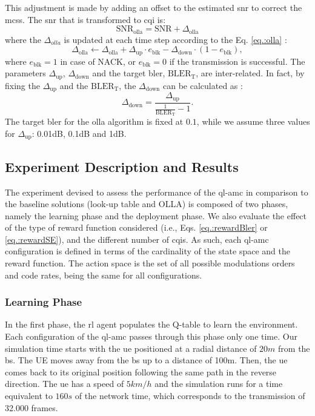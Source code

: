 %
This adjustment is made by adding an offset to the estimated \gls{snr} to correct the \gls{mcs}s.
%
The \gls{snr} that is transformed to \gls{cqi} is:
\begin{equation}
\textrm{SNR}_{\text{olla}} = \textrm{SNR} + \Delta_{\text{olla}}
\end{equation}
\noindent where the $\Delta_{olla}$ is updated at each time step according to the Eq. \eqref{eq.:olla} \cite{Blanquez-Casado2016}:
\begin{equation}\label{eq.:olla}
  \Delta_{\text{olla}} \leftarrow \Delta_{\text{olla}} + \Delta_{\text{up}} \cdot e_{\text{blk}} - \Delta_{\text{down}} \cdot (1 - e_{\text{blk}}),
\end{equation}
\noindent where $e_{\text{blk}} = 1$ in case of NACK, or $e_{\text{blk}} = 0$ if the transmission is successful.
%
The parameters $\Delta_{\text{up}}$, $\Delta_{\text{down}}$ and the target \gls{bler}, $\textrm{BLER}_{\text{T}}$, are inter-related. In fact, by fixing the $\Delta_{\text{up}}$ and the $\textrm{BLER}_{\text{T}}$, the $\Delta_{\text{down}}$ can be calculated as \cite{Pedersen2007}:
$$
\Delta_{\text{down}} = \frac{\Delta_{\text{up}}}{\frac{1}{\textrm{BLER}_{\text{T}}} -1}.
$$
The target \gls{bler} for the \gls{olla} algorithm is fixed at $0.1$, while we assume three values for $\Delta_{\text{up}}$: 0.01dB, 0.1dB and  1dB.

\subsection{Experiment Description and Results}

The experiment devised to assess the performance of the \gls{ql-amc} in comparison to the baseline solutions (look-up table and OLLA) is composed of two phases, namely the learning phase and the deployment phase.
%
We also evaluate the effect of the type of reward function considered (i.e., Eqs. \eqref{eq.:rewardBler} or \eqref{eq.:rewardSE}), and the different number of \gls{cqi}s. As such, each \gls{ql-amc} configuration is defined in terms of the cardinality of the state space and the reward function.
%
The action space is the set of all possible modulations orders and code rates, being the same for all configurations.


\subsubsection{Learning Phase}
In the first phase, the \gls{rl} agent populates the Q-table to learn the environment.
%
Each configuration of the \gls{ql-amc} passes through this phase only one time. Our simulation time starts with the \gls{ue} positioned at a radial distance of $20m$ from the \gls{bs}. The UE moves away from the \gls{bs} up to a distance of 100m. Then, the \gls{ue} comes back to its original position following the same path in the reverse direction.
%
The \gls{ue} has a speed of $5km/h$ and the simulation runs for a time equivalent to $160s$ of the network time, which corresponds to the transmission of 32.000 frames.
%


